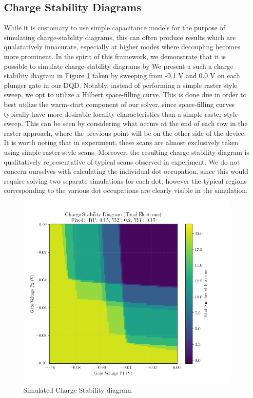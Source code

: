 \documentclass{article}
\begin{document}
\subsection{Charge Stability Diagrams}
While it is customary to use simple capacitance models for the purpose of simulating charge-stability diagrams, this can often produce results which are qualatatively innacurate, especially at higher modes where decoupling becomes more prominent. In the spirit of this framework, we demonstrate that it is possible to simulate charge-stability diagrams by
We present a such a charge stability diagram in Figure \ref{fig:charge_stability_diagram} taken by sweeping from -0.1 V and 0.0 V on each plunger gate in our DQD. Notably, instead of performing a simple raster style sweep, we opt to utilize a Hilbert space-filling curve. This is done due in order to best utilize the warm-start component of our solver, since space-filling curves typically have more desirable locality characteristics than a simple raster-style sweep. This can be seen by considering what occurs at the end of each row in the raster approach, where the previous point will be on the other side of the device. It is worth noting that in experiment, these scans are almost exclusively taken using simple raster-style scans. Moreover, the resulting charge stability diagram is qualitatively representative of typical scans observed in experiment. We do not concern ourselves with calculating the individual dot occupation, since this would require solving two separate simulations for each dot, however the typical regions corresponding to the various dot occupations are clearly visible in the simulation.
\begin{figure}[h!]
	\centering
	\includegraphics[width=\textwidth]{../figures/stability_results/charge_stability_P1_P2.png}
	\caption{Simulated Charge Stability diagram.}
	\label{fig:charge_stability_diagram}
\end{figure}
\end{document}
